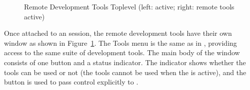 \begin{figure}[bt]
\begin{center}
\end{center}
\caption{Remote Development Tools Toplevel (left: {\eclipse} active; right:
remote tools active)}
\label{remotetools}
\end{figure}

Once attached to an {\eclipse} session, the remote development tools have
their own window as shown in Figure~\ref{remotetools}. The Tools menu is the
same as in {\tkeclipse}, providing access to the same suite of development
tools. The main body of the window consists of one button and a status
indicator. The indicator shows whether the tools can be used or not (the
tools cannot be used when the {\eclipse} is active), and the button
is used to pass control explicitly to {\eclipse}.


